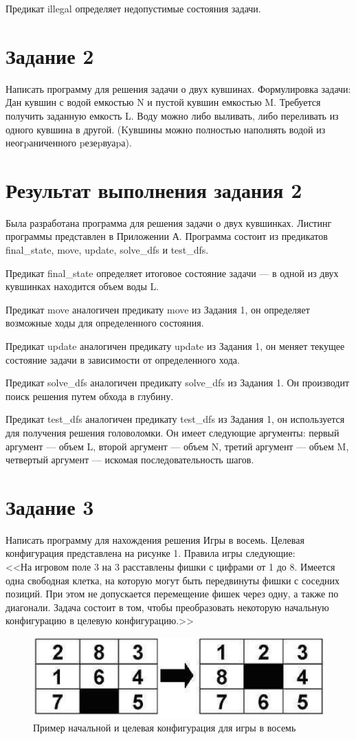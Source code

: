 \documentclass{article}
\begin{document}
Предикат illegal определяет недопустимые состояния задачи.

\section*{Задание 2}
Написать программу для решения задачи о двух кувшинах. Формулировка
задачи: Дан кувшин с водой емкостью N и пустой кувшин емкостью
M. Требуется получить заданную емкость L. Воду можно либо выливать,
либо переливать из одного кувшина в другой. (Kувшины можно полностью
наполнять водой из неогpаниченного pезеpвуаpа). 
\section*{Результат выполнения задания 2}
Была разработана программа для решения задачи о двух
кувшинках. Листинг программы представлен в Приложении А. Программа
состоит из предикатов final\_state, move, update, solve\_dfs и
test\_dfs.

Предикат final\_state определяет итоговое состояние задачи --- в одной
из двух кувшинках находится объем воды L.

Предикат move аналогичен предикату move из Задания 1, он определяет
возможные ходы для определенного состояния.

Предикат update аналогичен предикату update из Задания 1, он меняет
текущее состояние задачи в зависимости от определенного хода.

Предикат solve\_dfs аналогичен предикату solve\_dfs из Задания 1. Он
производит поиск решения путем обхода в глубину.

Предикат test\_dfs аналогичен предикату test\_dfs из Задания 1, он
используется для получения решения головоломки. Он имеет следующие
аргументы: первый аргумент --- объем L, второй аргумент --- объем N,
третий аргумент --- объем M, четвертый аргумент --- искомая
последовательность шагов.

\section*{Задание 3}
Написать программу для нахождения решения Игры в восемь. Целевая конфигурация представлена на рисунке 1. Правила игры следующие:\\
<<На игровом поле 3 на 3 расставлены фишки с цифрами от 1 до
8. Имеется одна свободная клетка, на которую могут быть передвинуты
фишки с соседних позиций. При этом не допускается перемещение фишек
через одну, а также по диагонали. Задача состоит в том, чтобы
преобразовать некоторую начальную конфигурацию в целевую
конфигурацию.>>
\begin{figure}[H]
  \includegraphics[width=\linewidth]{puzzle.png}
  \caption{Пример начальной и целевая конфигурация для игры в восемь}
  \label{fig:puzzle}
\end{figure}
\end{document}
